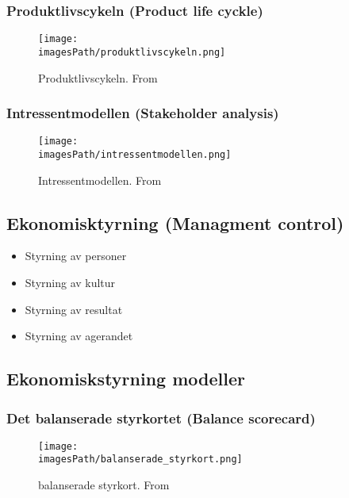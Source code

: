 \newpage
\subsubsection{Produktlivscykeln (Product life cyckle)}
\begin{figure}[!ht]
    \centering
    \texttt{[image: \\imagesPath/produktlivscykeln.png]}
    \caption{Produktlivscykeln. From \cite{im}}
\end{figure}

\subsubsection{Intressentmodellen (Stakeholder analysis)}
\begin{figure}[!ht]
    \centering
    \texttt{[image: \\imagesPath/intressentmodellen.png]}
    \caption{Intressentmodellen. From \cite{im}}
\end{figure}


\subsection{Ekonomisktyrning (Managment control)}
\begin{itemize}
    \item Styrning av personer
    \item Styrning av kultur
    \item Styrning av resultat
    \item Styrning av agerandet
\end{itemize}

\subsection{Ekonomiskstyrning modeller}
\subsubsection{Det balanserade styrkortet (Balance scorecard)}
\begin{figure}[H]
    \centering
    \texttt{[image: \\imagesPath/balanserade\_styrkort.png]}
    \caption{balanserade styrkort. From \cite{im}}
\end{figure}

